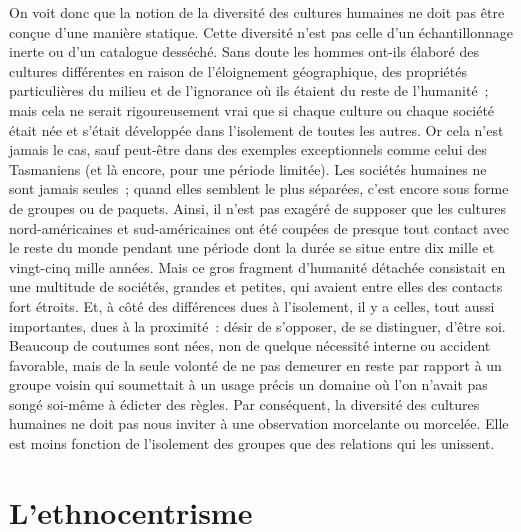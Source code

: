 \documentclass[french,twoside]{book} %
\begin{document}
On voit donc que la notion de la diversité des cultures humaines ne doit pas être conçue d’une manière statique. Cette diversité n’est pas celle d’un échantillonnage inerte ou d’un catalogue desséché. Sans doute les hommes ont-ils élaboré des cultures différentes en raison de l’éloignement géographique, des propriétés particulières du milieu et de l’ignorance où ils étaient du reste de l’humanité ; mais cela ne serait rigoureusement vrai que si chaque culture ou chaque société était née et s’était développée dans l’isolement de toutes les autres. Or cela n’est jamais le cas, sauf peut-être dans des exemples exceptionnels comme celui des Tasmaniens (et là encore, pour une période limitée). Les sociétés humaines ne sont jamais seules ; quand elles semblent le plus séparées, c’est encore sous forme de groupes ou de paquets. Ainsi, il n’est pas exagéré de supposer que les cultures nord-américaines et sud-américaines ont été coupées de presque tout contact avec le reste du monde pendant une période dont la durée se situe entre dix mille et vingt-cinq mille années. Mais ce gros fragment d’humanité détachée consistait en une multitude de sociétés, grandes et petites, qui avaient entre elles des contacts fort étroits. Et, à côté des différences dues à l’isolement, il y a celles, tout aussi importantes, dues à la proximité : désir de s’opposer, de se distinguer, d’être soi. Beaucoup de coutumes sont nées, non de quelque nécessité interne ou accident favorable, mais de la seule volonté de ne pas demeurer en reste par rapport à un groupe voisin qui soumettait à un usage précis un domaine où l’on n’avait pas songé soi-même à édicter des règles. Par conséquent, la diversité des cultures humaines ne doit pas nous inviter à une observation morcelante ou morcelée. Elle est moins fonction de l’isolement des groupes que des relations qui les unissent.

\section[{L’ethnocentrisme}]{L’ethnocentrisme}
\renewcommand{\leftmark}{L’ethnocentrisme}
\end{document}
